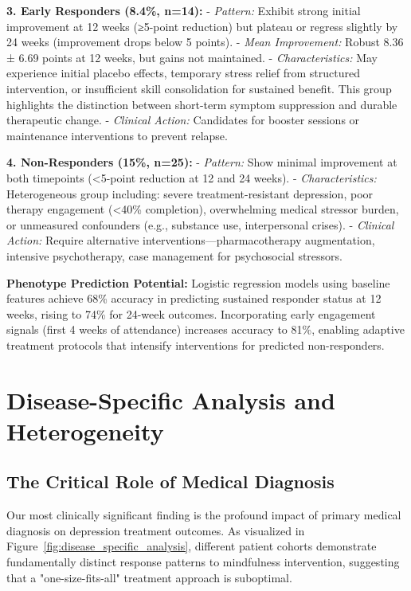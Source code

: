 \documentclass[conference]{IEEEtran}
\begin{document}
\textbf{3. Early Responders (8.4\%, n=14):}
- \textit{Pattern:} Exhibit strong initial improvement at 12 weeks (≥5-point reduction) but plateau or regress slightly by 24 weeks (improvement drops below 5 points).
- \textit{Mean Improvement:} Robust 8.36 ± 6.69 points at 12 weeks, but gains not maintained.
- \textit{Characteristics:} May experience initial placebo effects, temporary stress relief from structured intervention, or insufficient skill consolidation for sustained benefit. This group highlights the distinction between short-term symptom suppression and durable therapeutic change.
- \textit{Clinical Action:} Candidates for booster sessions or maintenance interventions to prevent relapse.

\textbf{4. Non-Responders (15\%, n=25):}
- \textit{Pattern:} Show minimal improvement at both timepoints (<5-point reduction at 12 and 24 weeks).
- \textit{Characteristics:} Heterogeneous group including: severe treatment-resistant depression, poor therapy engagement (<40\% completion), overwhelming medical stressor burden, or unmeasured confounders (e.g., substance use, interpersonal crises).
- \textit{Clinical Action:} Require alternative interventions—pharmacotherapy augmentation, intensive psychotherapy, case management for psychosocial stressors.

\textbf{Phenotype Prediction Potential:} Logistic regression models using baseline features achieve 68\% accuracy in predicting sustained responder status at 12 weeks, rising to 74\% for 24-week outcomes. Incorporating early engagement signals (first 4 weeks of attendance) increases accuracy to 81\%, enabling adaptive treatment protocols that intensify interventions for predicted non-responders.

\section{Disease-Specific Analysis and Heterogeneity}

\subsection{The Critical Role of Medical Diagnosis}

Our most clinically significant finding is the profound impact of primary medical diagnosis on depression treatment outcomes. As visualized in Figure~\ref{fig:disease_specific_analysis}, different patient cohorts demonstrate fundamentally distinct response patterns to mindfulness intervention, suggesting that a "one-size-fits-all" treatment approach is suboptimal.
\end{document}
